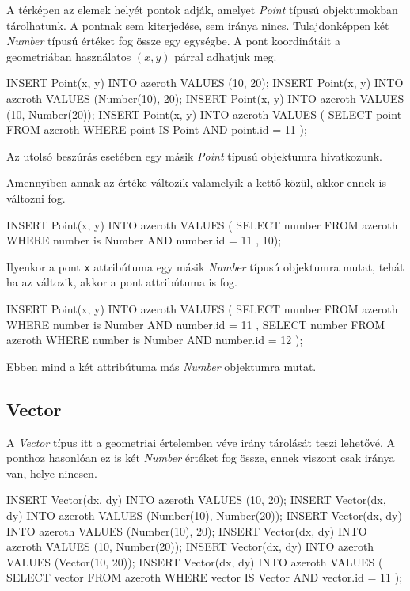 A térképen az elemek helyét pontok adják, amelyet \textit{Point} típusú objektumokban tárolhatunk. A pontnak sem kiterjedése, sem iránya nincs. Tulajdonképpen két \textit{Number} típusú értéket fog össze egy egységbe. A pont koordinátáit a geometriában használatos $(x, y)$ párral adhatjuk meg.

\begin{sql}
INSERT Point(x, y) INTO azeroth VALUES (10, 20);
INSERT Point(x, y) INTO azeroth VALUES (Number(10), 20);
INSERT Point(x, y) INTO azeroth VALUES (10, Number(20));
INSERT Point(x, y) INTO azeroth VALUES (
{ SELECT point FROM azeroth
  WHERE point IS Point AND point.id = 11 });
\end{sql}

Az utolsó beszúrás esetében egy másik \textit{Point} típusú objektumra hivatkozunk.

\noindent Amennyiben annak az értéke változik valamelyik a kettő közül, akkor ennek is változni fog.

\begin{sql}
INSERT Point(x, y) INTO azeroth VALUES ({
  SELECT number FROM azeroth
  WHERE number is Number AND number.id = 11 }, 10);
\end{sql}

Ilyenkor a pont \texttt{x} attribútuma egy másik \textit{Number} típusú objektumra mutat, tehát ha az változik, akkor a pont attribútuma is fog.

\begin{sql}
INSERT Point(x, y) INTO azeroth VALUES (
    { SELECT number FROM azeroth
    WHERE number is Number AND number.id = 11 },
    { SELECT number FROM azeroth
    WHERE number is Number AND number.id = 12 }
);
\end{sql}

Ebben mind a két attribútuma más \textit{Number} objektumra mutat.

\subsection{Vector}

A \textit{Vector} típus itt a geometriai értelemben véve irány tárolását teszi lehetővé. A ponthoz hasonlóan ez is két \textit{Number} értéket fog össze, ennek viszont csak iránya van, helye nincsen.

\begin{sql}
INSERT Vector(dx, dy) INTO azeroth VALUES (10, 20);
INSERT Vector(dx, dy) INTO azeroth VALUES (Number(10), Number(20));
INSERT Vector(dx, dy) INTO azeroth VALUES (Number(10), 20);
INSERT Vector(dx, dy) INTO azeroth VALUES (10, Number(20));
INSERT Vector(dx, dy) INTO azeroth VALUES (Vector(10, 20));
INSERT Vector(dx, dy) INTO azeroth VALUES (
{ SELECT vector FROM azeroth WHERE vector IS Vector AND vector.id = 11 }
);
\end{sql}

